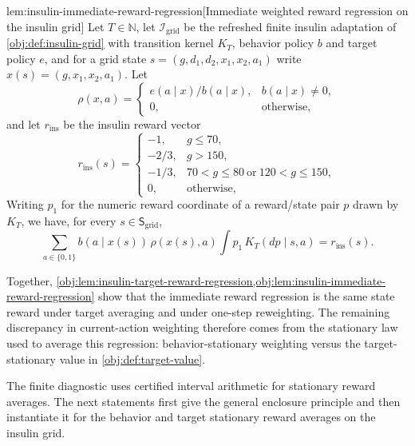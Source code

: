 \begin{lemmav}{lem:insulin-immediate-reward-regression}[Immediate weighted reward regression on the insulin grid]
Let \(T\in\mathbb N\), let \(\mathcal I_{\mathrm{grid}}\) be the refreshed finite insulin adaptation of \cref{obj:def:insulin-grid} with transition kernel \(K_T\), behavior policy \(b\) and target policy \(e\), and for a grid state \(s=(g,d_1,d_2,x_1,x_2,a_1)\) write \(x(s)=(g,x_1,x_2,a_1)\). Let
\[
\rho(x,a)=\begin{cases}e(a\mid x)/b(a\mid x),&b(a\mid x)\ne0,\\0,&\text{otherwise},\end{cases}
\]
and let \(r_{\mathrm{ins}}\) be the insulin reward vector
\[
r_{\mathrm{ins}}(s)=
\begin{cases}
-1,&g\le70,\\
-2/3,&g>150,\\
-1/3,&70<g\le80\ \text{or}\ 120<g\le150,\\
0,&\text{otherwise},
\end{cases}
\]
Writing \(p_1\) for the numeric reward coordinate of a reward/state pair \(p\) drawn by \(K_T\), we have, for every \(s\in\mathsf S_{\mathrm{grid}}\),
\[
\sum_{a\in\{0,1\}}b(a\mid x(s))\,\rho(x(s),a)\int p_1\,K_T(dp\mid s,a)
=
r_{\mathrm{ins}}(s) .
\]
\end{lemmav}

Together, \cref{obj:lem:insulin-target-reward-regression,obj:lem:insulin-immediate-reward-regression} show that the immediate reward regression is the same state reward under target averaging and under one-step reweighting. The remaining discrepancy in current-action weighting therefore comes from the stationary law used to average this regression: behavior-stationary weighting versus the target-stationary value in \cref{obj:def:target-value}.

The finite diagnostic uses certified interval arithmetic for stationary reward averages. The next statements first give the general enclosure principle and then instantiate it for the behavior and target stationary reward averages on the insulin grid.

